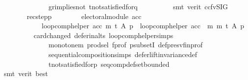 \begin{isabellebody}
\ \ \ \ \ \ \ \ \ \ \ \ \ \ gr{\isacharunderscore}{\kern0pt}implies{\isacharunderscore}{\kern0pt}not{}\ t{\isacharunderscore}{\kern0pt}not{\isacharunderscore}{\kern0pt}satisfied{\isacharunderscore}{\kern0pt}for{\isacharunderscore}{\kern0pt}q\isanewline
\ \ \ \ \ \ \ \ \isamarkupfalse%
\ {\isacharparenleft}{\kern0pt}smt\ {\isacharparenleft}{\kern0pt}verit{\isacharcomma}{\kern0pt}\ ccfv{\isacharunderscore}{\kern0pt}SIG{\isacharparenright}{\kern0pt}{\isacharparenright}{\kern0pt}\isanewline
\ \ \ \ \ \ \isamarkupfalse%
\ rec{\isacharunderscore}{\kern0pt}step{\isacharunderscore}{\kern0pt}p{\isacharcolon}{\kern0pt}\isanewline
\ \ \ \ \ \ \ \ {\isachardoublequoteopen}electoral{\isacharunderscore}{\kern0pt}module\ acc\ {\isasymlongrightarrow}\isanewline
\ \ \ \ \ \ \ \ \ \ \ \ loop{\isacharunderscore}{\kern0pt}comp{\isacharunderscore}{\kern0pt}helper\ acc\ m\ t\ A\ p\ {\isacharequal}{\kern0pt}\ loop{\isacharunderscore}{\kern0pt}comp{\isacharunderscore}{\kern0pt}helper\ {\isacharparenleft}{\kern0pt}acc\ {\isasymtriangleright}\ m{\isacharparenright}{\kern0pt}\ m\ t\ A\ p{\isachardoublequoteclose}\isanewline
\ \ \ \ \ \ \ \ \isamarkupfalse%
\ card{\isacharunderscore}{\kern0pt}changed\ defer{\isacharunderscore}{\kern0pt}in{\isacharunderscore}{\kern0pt}alts\ loop{\isacharunderscore}{\kern0pt}comp{\isacharunderscore}{\kern0pt}helper{\isachardot}{\kern0pt}simps{\isacharparenleft}{\kern0pt}{}{\isacharparenright}{\kern0pt}\isanewline
\ \ \ \ \ \ \ \ \ \ \ \ \ \ monotone{\isacharunderscore}{\kern0pt}m\ prod{\isachardot}{\kern0pt}sel{\isacharparenleft}{\kern0pt}{}{\isacharparenright}{\kern0pt}\ f{\isacharunderscore}{\kern0pt}prof\ psubsetI\ def{\isacharunderscore}{\kern0pt}presv{\isacharunderscore}{\kern0pt}fin{\isacharunderscore}{\kern0pt}prof\isanewline
\ \ \ \ \ \ \ \ \ \ \ \ \ \ sequential{\isacharunderscore}{\kern0pt}composition{\isachardot}{\kern0pt}simps\ defer{\isacharunderscore}{\kern0pt}lift{\isacharunderscore}{\kern0pt}invariance{\isacharunderscore}{\kern0pt}def\isanewline
\ \ \ \ \ \ \ \ \ \ \ \ \ \ t{\isacharunderscore}{\kern0pt}not{\isacharunderscore}{\kern0pt}satisfied{\isacharunderscore}{\kern0pt}for{\isacharunderscore}{\kern0pt}p\ seq{\isacharunderscore}{\kern0pt}comp{\isacharunderscore}{\kern0pt}def{\isacharunderscore}{\kern0pt}set{\isacharunderscore}{\kern0pt}bounded\isanewline
\ \ \ \ \ \ \ \ \isamarkupfalse%
\ {\isacharparenleft}{\kern0pt}smt\ {\isacharparenleft}{\kern0pt}verit{\isacharcomma}{\kern0pt}\ best{\isacharparenright}{\kern0pt}{\isacharparenright}{\kern0pt}\isanewline

\end{isabellebody}
